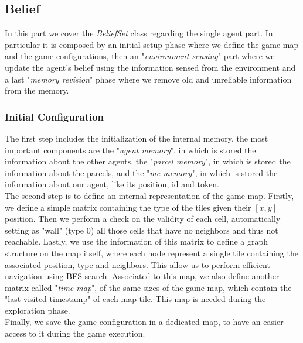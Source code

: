     \subsection{Belief}
        In this part we cover the \textit{BeliefSet} class regarding the single agent part. In particular it is composed by an initial setup phase where we define the game map and the game configurations, then an "\textit{environment sensing}" part where we update the agent's belief using the information sensed from the environment and a last "\textit{memory revision}" phase where we remove old and unreliable information from the memory.

        \subsubsection{Initial Configuration}
            The first step includes the initialization of the internal memory, the most important components are the "\textit{agent memory}", in which is stored the information about the other agents, the "\textit{parcel memory}", in which is stored the information about the parcels, and the "\textit{me memory}", in which is stored the information about our agent, like its position, id and token.
            \medskip\\
            The second step is to define an internal representation of the game map. Firstly, we define a simple matrix containing the type of the tiles given their $[x, y]$ position. Then we perform a check on the validity of each cell, automatically setting as "wall" (type $0$) all those cells that have no neighbors and thus not reachable. Lastly, we use the information of this matrix to define a graph structure on the map itself, where each node represent a single tile containing the associated position, type and neighbors. This allow us to perform efficient navigation using BFS search. Associated to this map, we also define another matrix called "\textit{time map}", of the same sizes of the game map, which contain the "last visited timestamp" of each map tile. This map is needed during the exploration phase.
            \medskip\\
            Finally, we save the game configuration in a dedicated map, to have an easier access to it during the game execution.


